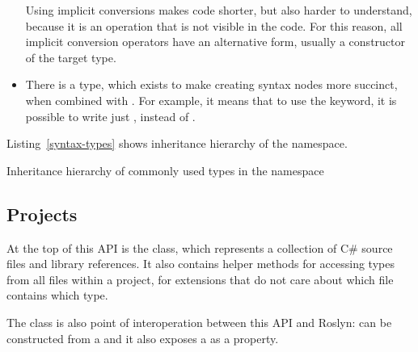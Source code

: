 \begin{itemize}
Using implicit conversions makes code shorter, but also harder to understand, because it is an operation that is not visible in the code. For this reason, all implicit conversion operators have an alternative form, usually a constructor of the target type.

\item There is a  type, which exists to make creating syntax nodes more succinct, when combined with . For example, it means that to use the  keyword, it is possible to write just , instead of  .

\end{itemize}

Listing~\ref{syntax-types} shows inheritance hierarchy of the  namespace.

\begin{listing}
	

\caption{Inheritance hierarchy of commonly used types in the  namespace}
\label{syntax-types}
	
\end{listing}


\subsection{Projects}

At the top of this \ac{API} is the  class, which represents a collection of C\# source files and library references. It also contains helper methods for accessing types from all files within a project, for extensions that do not care about which file contains which type.

The  class is also point of interoperation between this \ac{API} and Roslyn:  can be constructed from a  and it also exposes a  as a property.

